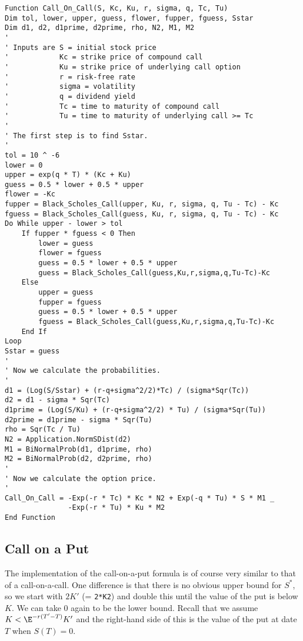 \small\begin{verbatim}
Function Call_On_Call(S, Kc, Ku, r, sigma, q, Tc, Tu)
Dim tol, lower, upper, guess, flower, fupper, fguess, Sstar
Dim d1, d2, d1prime, d2prime, rho, N2, M1, M2
'
' Inputs are S = initial stock price
'            Kc = strike price of compound call
'            Ku = strike price of underlying call option
'            r = risk-free rate
'            sigma = volatility
'            q = dividend yield
'            Tc = time to maturity of compound call
'            Tu = time to maturity of underlying call >= Tc
'
' The first step is to find Sstar.
'
tol = 10 ^ -6
lower = 0
upper = exp(q * T) * (Kc + Ku)
guess = 0.5 * lower + 0.5 * upper
flower = -Kc
fupper = Black_Scholes_Call(upper, Ku, r, sigma, q, Tu - Tc) - Kc
fguess = Black_Scholes_Call(guess, Ku, r, sigma, q, Tu - Tc) - Kc
Do While upper - lower > tol
    If fupper * fguess < 0 Then
        lower = guess
        flower = fguess
        guess = 0.5 * lower + 0.5 * upper
        guess = Black_Scholes_Call(guess,Ku,r,sigma,q,Tu-Tc)-Kc
    Else
        upper = guess
        fupper = fguess
        guess = 0.5 * lower + 0.5 * upper
        fguess = Black_Scholes_Call(guess,Ku,r,sigma,q,Tu-Tc)-Kc
    End If
Loop
Sstar = guess
'
' Now we calculate the probabilities.
'
d1 = (Log(S/Sstar) + (r-q+sigma^2/2)*Tc) / (sigma*Sqr(Tc))
d2 = d1 - sigma * Sqr(Tc)
d1prime = (Log(S/Ku) + (r-q+sigma^2/2) * Tu) / (sigma*Sqr(Tu))
d2prime = d1prime - sigma * Sqr(Tu)
rho = Sqr(Tc / Tu)
N2 = Application.NormSDist(d2)
M1 = BiNormalProb(d1, d1prime, rho)
M2 = BiNormalProb(d2, d2prime, rho)
'
' Now we calculate the option price.
'
Call_On_Call = -Exp(-r * Tc) * Kc * N2 + Exp(-q * Tu) * S * M1 _
               -Exp(-r * Tu) * Ku * M2
End Function
\end{verbatim}\normalsize

\subsection*{Call on a Put}

The implementation of the call-on-a-put formula is of course very similar to that of a call-on-a-call.  One difference is that there is no obvious upper bound for $S^*$, so we start with $2K'$ (= \verb!2*K2!) and double this until the value of the put is below $K$.  We can take 0 again to be the lower bound.  Recall that we assume $K<\E^{-r(T'-T)}K'$ and the right-hand side of this is the value of the put at date $T$ when $S(T)=0$.

